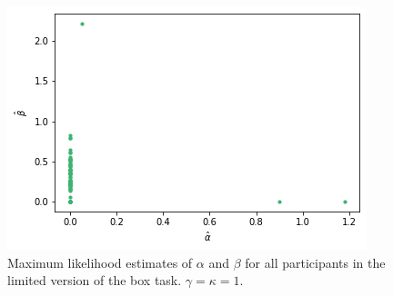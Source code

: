 \begin{figure}
    \centering
    \includegraphics[scale=0.8]{pictures/plotted_mles_limited_alpha_beta_gk1.png}
    \caption[MLEs of $\alpha$ and $\beta$, limited. $\gamma=\kappa=1$]{Maximum likelihood estimates of $\alpha$ and $\beta$ for all participants in the limited version of the box task. $\gamma=\kappa=1$.}
    \label{fig:mles_limited_alpha_beta}
\end{figure}



